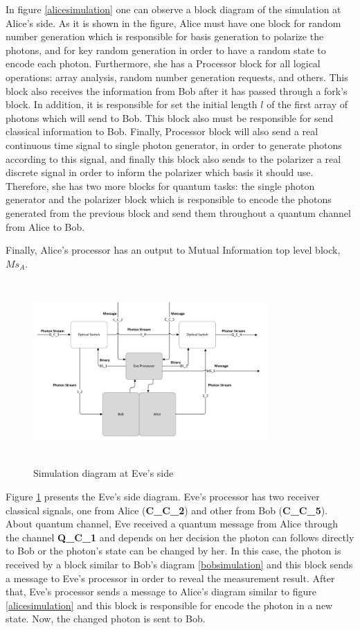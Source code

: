     In figure \ref{alicesimulation} one can observe a block diagram of the simulation at Alice's side. As it is shown in the figure, Alice must have one block for random number generation which is responsible for basis generation to polarize the photons, and for key random generation in order to have a random state to encode each photon. Furthermore, she has a Processor block for all logical operations: array analysis, random number generation requests, and others. This block also receives the information from Bob after it has passed through a fork's block. In addition, it is responsible for set the initial length $l$ of the first array of photons which will send to Bob. This block also must be responsible for send classical information to Bob. Finally, Processor block will also send a real continuous time signal to single photon generator, in order to generate photons according to this signal, and finally this block also sends to the polarizer a real discrete signal in order to inform the polarizer which basis it should use. Therefore, she has two more blocks for quantum tasks: the single photon generator and the polarizer block which is responsible to encode the photons generated from the previous block and send them throughout a quantum channel from Alice to Bob.

    Finally, Alice's processor has an output to Mutual Information top level block, $Ms_{A}$.

\begin{figure}[H]
	\centering
	\includegraphics[width=0.8\textwidth, height=7cm]{./sdf/bb84_with_discrete_variables/figures/eve_simulation.png}
	\caption{Simulation diagram at Eve's side}\label{evesimulation}
\end{figure}

Figure \ref{evesimulation} presents the Eve's side diagram. Eve's processor has two receiver classical signals, one from Alice (\textbf{C\_C\_2}) and other from Bob (\textbf{C\_C\_5}). About quantum channel, Eve received a quantum message from Alice through the channel \textbf{Q\_C\_1} and depends on her decision the photon can follows directly to Bob or the photon's state can be changed by her. In this case, the photon is received by a block similar to Bob's diagram \ref{bobsimulation} and this block sends a message to Eve's processor in order to reveal the measurement result. After that, Eve's processor sends a message to Alice's diagram similar to figure \ref{alicesimulation} and this block is responsible for encode the photon in a new state. Now, the changed photon is sent to Bob. 

